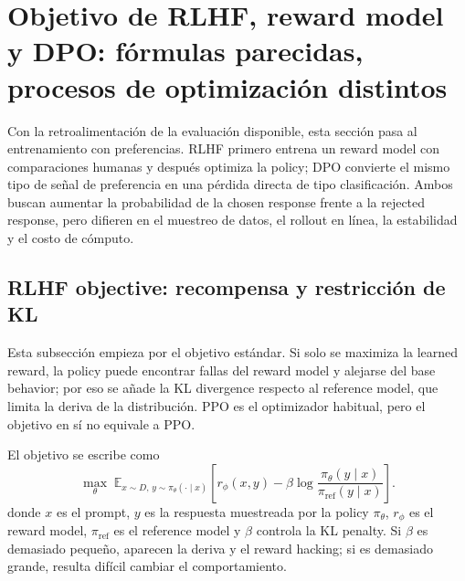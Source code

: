 \section{Objetivo de RLHF, reward model y DPO: fórmulas parecidas, procesos de optimización distintos}

Con la retroalimentación de la evaluación disponible, esta sección pasa al entrenamiento con preferencias. RLHF primero entrena un reward model con comparaciones humanas y después optimiza la policy; DPO convierte el mismo tipo de señal de preferencia en una pérdida directa de tipo clasificación. Ambos buscan aumentar la probabilidad de la chosen response frente a la rejected response, pero difieren en el muestreo de datos, el rollout en línea, la estabilidad y el costo de cómputo.

\subsection{RLHF objective: recompensa y restricción de KL}

Esta subsección empieza por el objetivo estándar. Si solo se maximiza la learned reward, la policy puede encontrar fallas del reward model y alejarse del base behavior; por eso se añade la KL divergence respecto al reference model, que limita la deriva de la distribución. PPO es el optimizador habitual, pero el objetivo en sí no equivale a PPO.




El objetivo se escribe como
\[
\max_{\theta}\;\mathbb{E}_{x\sim D,\,y\sim\pi_{\theta}(\cdot\mid x)}
\left[r_{\phi}(x,y)-\beta\log\frac{\pi_{\theta}(y\mid x)}{\pi_{\mathrm{ref}}(y\mid x)}\right].
\]
donde $x$ es el prompt, $y$ es la respuesta muestreada por la policy $\pi_{\theta}$, $r_{\phi}$ es el reward model, $\pi_{\mathrm{ref}}$ es el reference model y $\beta$ controla la KL penalty. Si $\beta$ es demasiado pequeño, aparecen la deriva y el reward hacking; si es demasiado grande, resulta difícil cambiar el comportamiento.


